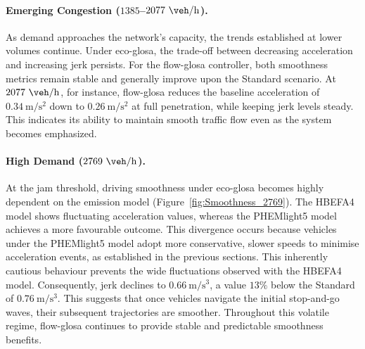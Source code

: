 \paragraph{Emerging Congestion ($1385$--$2077~\unit{\veh\per\hour}$).}
As demand approaches the network's capacity, the trends established at lower volumes continue. Under \ac{eco-glosa}, the trade-off between decreasing acceleration and increasing jerk persists. For the \ac{flow-glosa} controller, both smoothness metrics remain stable and generally improve upon the Standard scenario. At $2077~\unit{\veh\per\hour}$, for instance, \ac{flow-glosa} reduces the baseline acceleration of $0.34~\unit{\metre\per\second\squared}$ down to $0.26~\unit{\metre\per\second\squared}$ at full penetration, while keeping jerk levels steady. This indicates its ability to maintain smooth traffic flow even as the system becomes emphasized.

\paragraph{High Demand ($2769~\unit{\veh\per\hour}$).}
At the jam threshold, driving smoothness under \ac{eco-glosa} becomes highly dependent on the emission model (Figure~\vref{fig:Smoothness_2769}). The HBEFA4 model shows fluctuating acceleration values, whereas the PHEMlight5 model achieves a more favourable outcome. This divergence occurs because vehicles under the PHEMlight5 model adopt more conservative, slower speeds to minimise acceleration events, as established in the previous sections. This inherently cautious behaviour prevents the wide fluctuations observed with the HBEFA4 model. Consequently, jerk declines to $0.66~\unit{\metre\per\second\cubed}$, a value $13\%$ below the Standard of $0.76~\unit{\metre\per\second\cubed}$. This suggests that once vehicles navigate the initial stop-and-go waves, their subsequent trajectories are smoother. Throughout this volatile regime, \ac{flow-glosa} continues to provide stable and predictable smoothness benefits.

